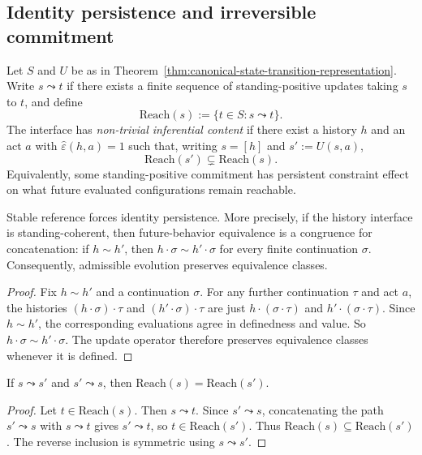 \subsection{Identity persistence and irreversible commitment}

\begin{definition}
Let $S$ and $U$ be as in Theorem~\ref{thm:canonical-state-transition-representation}. Write $s \leadsto t$ if there exists a finite sequence of standing-positive updates taking $s$ to $t$, and define
\[
\mathrm{Reach}(s):=\{t\in S : s \leadsto t\}.
\]
The interface has \emph{non-trivial inferential content} if there exist a history $h$ and an act $a$ with $\hat\varepsilon(h,a)=1$ such that, writing $s=[h]$ and $s':=U(s,a)$,
\[
\mathrm{Reach}(s')\subsetneq \mathrm{Reach}(s).
\]
Equivalently, some standing-positive commitment has persistent constraint effect on what future evaluated configurations remain reachable.
\end{definition}

\begin{theorem}
\label{thm:identity-persistence}
Stable reference forces identity persistence. More precisely, if the history interface is standing-coherent, then future-behavior equivalence is a congruence for concatenation: if $h\sim h'$, then $h\cdot \sigma \sim h'\cdot \sigma$ for every finite continuation $\sigma$. Consequently, admissible evolution preserves equivalence classes.
\end{theorem}

\begin{proof}
Fix $h\sim h'$ and a continuation $\sigma$. For any further continuation $\tau$ and act $a$, the histories $(h\cdot \sigma)\cdot \tau$ and $(h'\cdot \sigma)\cdot \tau$ are just $h\cdot(\sigma\cdot \tau)$ and $h'\cdot(\sigma\cdot \tau)$. Since $h\sim h'$, the corresponding evaluations agree in definedness and value. So $h\cdot \sigma \sim h'\cdot \sigma$. The update operator therefore preserves equivalence classes whenever it is defined.\cite{MaleyAMetric}
\end{proof}

\begin{lemma}
\label{lem:mutual-reachability-implies-equality}
If $s \leadsto s'$ and $s' \leadsto s$, then $\mathrm{Reach}(s)=\mathrm{Reach}(s')$.
\end{lemma}

\begin{proof}
Let $t \in \mathrm{Reach}(s)$. Then $s \leadsto t$. Since $s' \leadsto s$, concatenating the path $s' \leadsto s$ with $s \leadsto t$ gives $s' \leadsto t$, so $t \in \mathrm{Reach}(s')$. Thus $\mathrm{Reach}(s) \subseteq \mathrm{Reach}(s')$. The reverse inclusion is symmetric using $s \leadsto s'$.
\end{proof}

